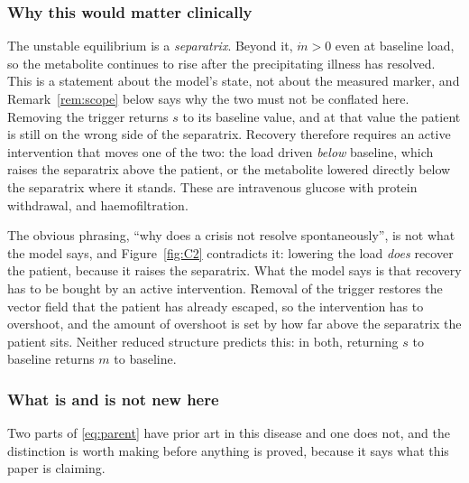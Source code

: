 \subsubsection{Why this would matter clinically}

The unstable equilibrium is a \emph{separatrix}. Beyond it, $\dot m > 0$ even at baseline
load, so the metabolite continues to rise after the precipitating illness has resolved.
This is a statement about the model's state, not about the measured marker, and
Remark~\ref{rem:scope} below says why the two must not be conflated here.
Removing the trigger returns $s$ to its baseline value, and at that value the patient is
still on the wrong side of the separatrix. Recovery therefore requires an active intervention that moves one of the two: the load
driven \emph{below} baseline, which raises the separatrix above the patient, or the
metabolite lowered directly below the separatrix where it stands. These are intravenous
glucose with protein withdrawal, and haemofiltration.

\begin{remark}
The obvious phrasing, ``why does a crisis not resolve spontaneously'', is not what the
model says, and Figure~\ref{fig:C2} contradicts it: lowering the load \emph{does} recover
the patient, because it raises the separatrix. What the model says is that recovery has to be
bought by an active intervention. Removal of the trigger
restores the vector field that the patient has already escaped, so the intervention has to
overshoot, and the amount of overshoot is set by how far above the separatrix the patient
sits. Neither reduced structure predicts this: in both, returning $s$ to baseline
returns $m$ to baseline.
\end{remark}

\subsubsection{What is and is not new here}
\label{sec:priorart}

Two parts of \eqref{eq:parent} have prior art in this disease and one does not, and the
distinction is worth making before anything is proved, because it says what this paper is
claiming.


